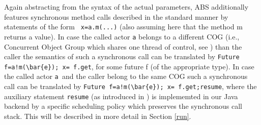 Again abstracting from the syntax of the actual parameters,
ABS additionally features synchronous method calls described in the standard manner
by statements of the form \lstinline| x=a.m(...)| (also assuming here that the method m returns a value). In case the called actor \lstinline|a| belongs to a different 
COG (i.e., Concurrent Object Group which shares one thread of control, see \cite{abs})
than the caller the semantics of such a synchronous call can be translated
by \lstinline|Future f=a!m(\bar{e}); x= f.get|, for some future f (of the appropriate type).
In case the called actor \lstinline|a |and the caller belong to the same COG such a synchronous call can be translated by \lstinline|Future f=a!m(\bar{e}); x= f.get;resume|,
where the auxiliary statement \lstinline|resume| (as introduced in \cite{resume})
is implememted in our Java backend by a specific scheduling policy which preserves the synchronous call stack.
This will be described in more detail in Section \ref{run}.




